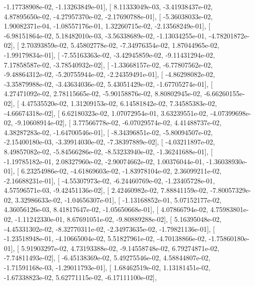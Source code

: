\documentclass{article}
\begin{document}
         -1.17738908e-02,  -1.13263849e-01],
       [  8.11333049e-03,  -3.41938437e-02,   4.87895650e-02,
         -4.27957370e-02,  -2.17690788e-01],
       [ -5.36038033e-02,   1.90082371e-04,  -1.08557176e-01,
          1.32260715e-02,  -2.13568249e-01],
       [ -6.98151864e-02,   5.18482010e-03,  -3.56338689e-02,
         -1.13034255e-01,  -4.78201872e-02],
       [  2.70393859e-02,   5.45802778e-02,  -7.34976354e-02,
          1.87044965e-02,  -1.99179834e-01],
       [ -7.55163363e-02,  -3.42945859e-02,  -9.11431294e-02,
          7.17858587e-02,  -3.78540932e-02],
       [ -1.33668157e-02,  -6.77807562e-02,  -9.48864312e-02,
         -5.20755944e-02,  -2.24359491e-01],
       [ -4.86298082e-02,  -3.35879988e-02,  -3.43634036e-02,
          5.43051429e-02,  -1.67705274e-01],
       [  4.27471092e-02,   2.78115665e-02,  -5.90158876e-02,
          8.80802945e-02,  -6.66260155e-02],
       [  4.47535520e-02,   1.31209153e-02,   6.14581842e-02,
          7.34585383e-02,  -4.66674318e-02],
       [  6.62180323e-02,   1.07072954e-01,   3.63239551e-02,
         -4.07399698e-02,  -9.10608914e-02],
       [  3.77566778e-02,  -6.07029574e-02,   4.41488737e-02,
          4.38287283e-02,  -1.64700546e-01],
       [ -8.34396851e-02,  -5.80094507e-02,  -2.15400180e-03,
         -3.39914030e-02,  -7.38397889e-02],
       [ -4.03211897e-02,   8.49857082e-02,  -5.84566286e-02,
         -8.53233940e-02,  -1.36241688e-01],
       [ -1.19785182e-01,   2.08327960e-02,  -2.90074662e-02,
          1.00376044e-01,  -1.36038930e-01],
       [  6.23254986e-02,  -4.61869603e-02,  -1.83978104e-02,
          2.36099211e-02,  -2.16688231e-01],
       [ -4.55307973e-02,  -6.24460769e-02,  -1.23405728e-01,
          4.57596571e-03,  -9.42451136e-02],
       [  2.42460982e-02,   7.88841159e-02,  -7.80057329e-02,
          3.32986633e-02,  -1.04656307e-01],
       [ -1.13168852e-01,   5.07152177e-02,   4.36056126e-03,
          8.41817647e-02,  -1.05650668e-01],
       [  4.07866794e-02,   4.75983801e-02,  -1.11242330e-01,
          8.67691051e-02,  -9.80889288e-02],
       [  5.16395048e-02,  -4.45331302e-02,  -8.32770311e-02,
         -2.34973635e-02,  -1.79821136e-01],
       [ -1.23518948e-01,  -4.10665004e-02,   5.51827961e-02,
         -4.70138866e-02,  -1.75860180e-01],
       [  5.91903297e-02,   4.73193388e-02,  -9.14558748e-02,
          6.79274871e-02,  -7.74811493e-02],
       [ -6.45138369e-02,   5.49275546e-02,   4.58844807e-02,
         -1.71591168e-03,  -1.29011793e-01],
       [  1.68462519e-02,   1.13181451e-02,  -1.67338823e-02,
          5.62771115e-02,  -6.17111100e-02],
\end{document}

